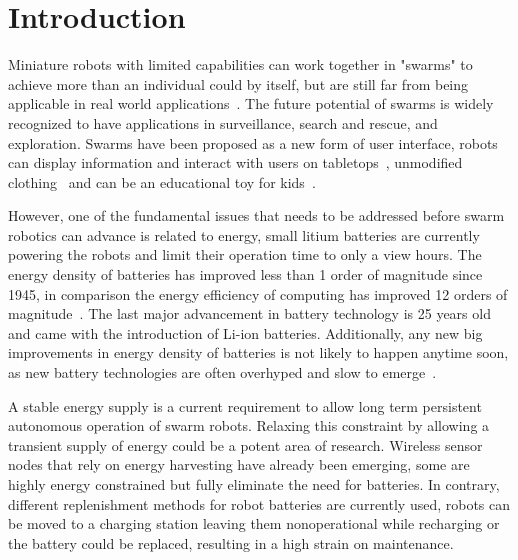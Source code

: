 \chapter{Introduction}
\label{chp:introduction}



Miniature robots with limited capabilities can work together in "swarms" to achieve more than an individual could by itself, but are still far from being applicable in real world applications~\cite{barca_sekercioglu_2013}.
The future potential of swarms is widely recognized to have applications in surveillance, search and rescue, and exploration.
Swarms have been proposed as a new form of user interface, robots can display information and interact with users on tabletops~\cite{legoc_uist_2016}, unmodified clothing~\cite{dementyev_uist_2016} and can be an educational toy for kids~\cite{sony_toio_2017}.
\hfill \break


However, one of the fundamental issues that needs to be addressed before swarm robotics can advance is related to energy, small litium batteries are currently powering the robots and limit their operation time to only a view hours. 
The energy density of batteries has improved less than 1 order of magnitude since 1945, in comparison the energy efficiency of computing has improved 12 orders of magnitude~\cite{patel_pvc_2017}.
The last major advancement in battery technology is 25 years old and came with the introduction of Li-ion batteries.
Additionally, any new big improvements in energy density of batteries is not likely to happen anytime soon, as new battery technologies are often overhyped and slow to emerge~\cite{zachary_spec_2016}.
\hfill \break



A stable energy supply is a current requirement to allow long term persistent autonomous operation of swarm robots.
Relaxing this constraint by allowing a transient supply of energy could be a potent area of research.
Wireless sensor nodes that rely on energy harvesting have already been emerging, some are highly energy constrained but fully eliminate the need for batteries.
In contrary, different replenishment methods for robot batteries are currently used, robots can be moved to a charging station leaving them nonoperational while recharging or the battery could be replaced, resulting in a high strain on maintenance.

